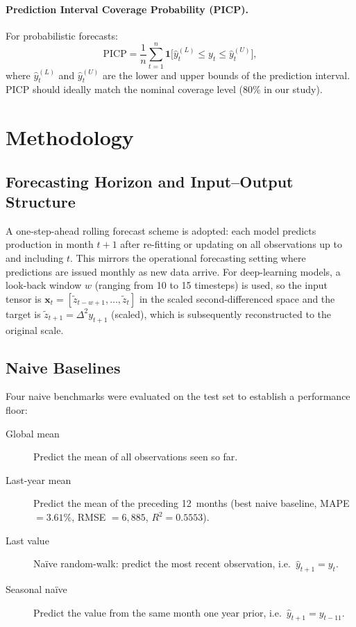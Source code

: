 \documentclass[12pt,a4paper]{article}
\begin{document}
\paragraph{Prediction Interval Coverage Probability (PICP).}
For probabilistic forecasts:
\begin{equation}
  \mathrm{PICP} = \frac{1}{n}\sum_{t=1}^{n}\mathbf{1}\!\bigl[\hat{y}_t^{(L)} \le y_t \le \hat{y}_t^{(U)}\bigr],
  \label{eq:picp}
\end{equation}
where $\hat{y}_t^{(L)}$ and $\hat{y}_t^{(U)}$ are the lower and upper bounds of the prediction interval. PICP should ideally match the nominal coverage level (80\% in our study).

\section{Methodology}

\subsection{Forecasting Horizon and Input--Output Structure}

A one-step-ahead rolling forecast scheme is adopted: each model predicts production in month $t+1$ after re-fitting or updating on all observations up to and including $t$. This mirrors the operational forecasting setting where predictions are issued monthly as new data arrive. For deep-learning models, a look-back window $w$ (ranging from 10 to 15 timesteps) is used, so the input tensor is $\mathbf{x}_t = [\tilde{z}_{t-w+1}, \ldots, \tilde{z}_t]$ in the scaled second-differenced space and the target is $\tilde{z}_{t+1} = \Delta^2 y_{t+1}$ (scaled), which is subsequently reconstructed to the original scale.

\subsection{Naive Baselines}

Four naive benchmarks were evaluated on the test set to establish a performance floor:
\begin{description}
  \item[Global mean] Predict the mean of all observations seen so far.
  \item[Last-year mean] Predict the mean of the preceding 12~months (best naive baseline, MAPE $= 3.61\%$, RMSE $= 6{,}885$, $R^2 = 0.5553$).
  \item[Last value] Na\"ive random-walk: predict the most recent observation, i.e.\ $\hat{y}_{t+1} = y_t$.
  \item[Seasonal na\"ive] Predict the value from the same month one year prior, i.e.\ $\hat{y}_{t+1} = y_{t-11}$.
\end{description}
\end{document}
